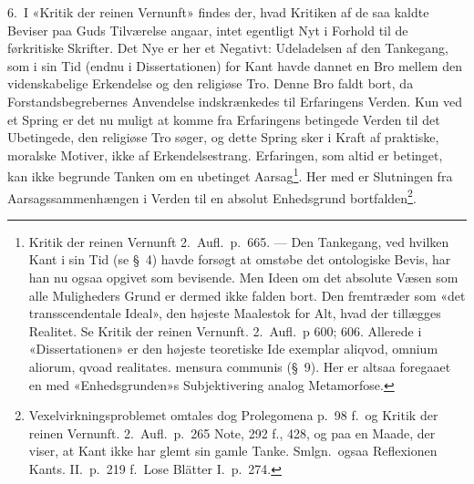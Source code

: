 \documentclass[12pt,a4paper]{article}
\newcommand{\opage}[1]{\marginnote{\footnotesize\textit{[#1]}}}
\begin{document}
6.\ I «Kritik der reinen Vernunft» findes der, hvad Kritiken af de saa
kaldte Beviser paa Guds Tilværelse angaar, intet egentligt Nyt i Forhold
til de førkritiske Skrifter. Det Nye er her et Negativt: Udeladelsen af
den Tankegang, som i sin Tid (endnu i Dissertationen) for Kant havde
dannet en Bro mellem den videnskabelige Erkendelse og den religiøse Tro.
Denne Bro faldt bort, da Forstandsbegrebernes Anvendelse indskrænkedes
til Erfaringens Verden. Kun ved et Spring er det nu muligt at komme fra
Erfaringens betingede Verden til det Ubetingede, den religiøse Tro søger,
og dette Spring sker i Kraft af praktiske, moralske Motiver, ikke af
Erkendelsestrang. Erfaringen, som altid er betinget, kan ikke begrunde
Tanken om en ubetinget Aarsag\footnote{Kritik der reinen
Vernunft 2.\ Aufl.\ p.\ 665. --- Den Tankegang, ved hvilken Kant i sin
Tid (se §\ 4) havde forsøgt at omstøbe det ontologiske Bevis, har han nu
ogsaa opgivet som bevisende. Men Ideen om det absolute Væsen som alle
Muligheders Grund er dermed ikke falden bort. Den fremtræder som «det
transscendentale Ideal», den højeste Maalestok for Alt, hvad der tillægges
Realitet. Se Kritik der reinen Vernunft. 2.\ Aufl.\ p 600;
606. Allerede i «Dissertationen» er den højeste teoretiske Ide
exemplar aliqvod, omnium aliorum, qvoad realitates. mensura
communis (§\ 9). Her er altsaa foregaaet en med «Enhedsgrunden»s
Subjektivering analog Metamorfose.}. Her%
\opage{16}med er Slutningen fra
Aarsagssammenhængen i Verden til en absolut Enhedsgrund
bortfalden\footnote{Vexelvirkningsproblemet omtales dog Prolegomena
p.\ 98 f.\ og Kritik der reinen Vernunft. 2.\ Aufl.\ p.\ 265
Note, 292 f., 428, og paa en Maade, der viser, at Kant ikke har glemt sin
gamle Tanke. Smlgn.\ ogsaa Reflexionen Kants. II.\ p.\ 219 f.\
Lose Blätter I.\ p.\ 274.}.
\end{document}
